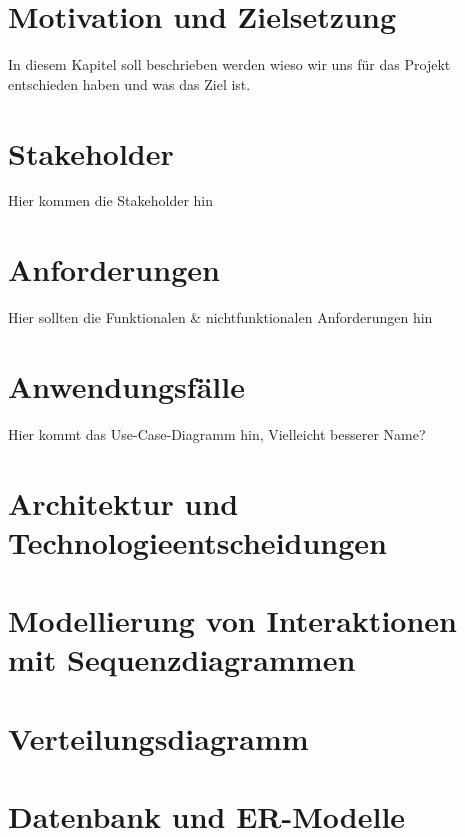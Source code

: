 \section{Motivation und Zielsetzung}
In diesem Kapitel soll beschrieben werden wieso wir uns für das Projekt entschieden haben und was das Ziel ist.
\section{Stakeholder}
Hier kommen die Stakeholder hin
\section{Anforderungen}
Hier sollten die Funktionalen \& nichtfunktionalen Anforderungen hin
\section{Anwendungsfälle}
Hier kommt das Use-Case-Diagramm hin, Vielleicht besserer Name?
\section{Architektur und Technologieentscheidungen}
\section{Modellierung von Interaktionen mit Sequenzdiagrammen}
\section{Verteilungsdiagramm}
\section{Datenbank und ER-Modelle}

